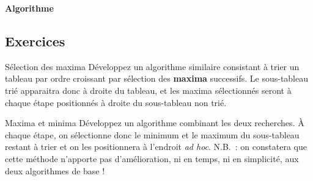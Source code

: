 	{\sffamily\bfseries\upshape
	Algorithme}
	

	\bigskip


	\subsection*{Exercices}

	\begin{Exercice}{Sélection des maxima}
		Développez un algorithme similaire consistant à trier un tableau par
		ordre croissant par sélection des \textbf{maxima} successifs. Le
		sous-tableau trié apparaitra donc à droite du tableau, et les maxima
		sélectionnés seront à chaque étape positionnés à droite du sous-tableau
		non trié. 
	\end{Exercice}
	
	\begin{Exercice}{Maxima et minima}
		Développez un algorithme combinant les deux recherches. À chaque étape,
		on sélectionne donc le minimum et le maximum du sous-tableau restant à
		trier et on les positionnera à l’endroit \textit{ad hoc}. N.B.~: on
		constatera que cette méthode n’apporte pas d’amélioration, ni en temps,
		ni en simplicité, aux deux algorithmes de base !
	\end{Exercice}
	

